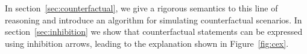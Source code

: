 In section~\ref{sec:counterfactual}, we give a rigorous semantics to
this line of reasoning and introduce an algorithm for simulating
counterfactual scenarios. In section~\ref{sec:inhibition} we show that
counterfactual statements can be expressed using inhibition arrows,
leading to the explanation shown in Figure~\ref{fig:cex}.

